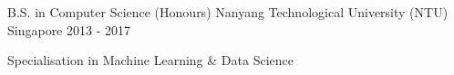 

\begin{cventries}

  \cventry
    {B.S. in Computer Science (Honours)} %
    {Nanyang Technological University (NTU)} %
    {Singapore} %
    {2013 - 2017} %
    {
      \begin{cvitems} %
        \item {Specialisation in Machine Learning \& Data Science}
      \end{cvitems}
    }

\end{cventries}
